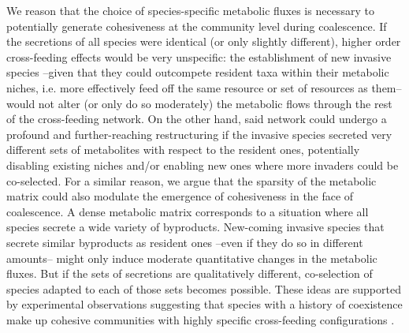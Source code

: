 \documentclass[a4paper,10pt]{article}
\begin{document}
\begin{mdframed}
We reason that the choice of species-specific metabolic fluxes is necessary to potentially generate
cohesiveness at the community level during coalescence.
If the secretions of all species were identical (or only slightly different),
higher order cross-feeding effects would be very unspecific:
the establishment of new invasive species
--given that they could outcompete resident taxa within their metabolic niches,
i.e. more effectively feed off the same resource or set of resources as them--
would not alter (or only do so moderately)
the metabolic flows through the rest of the cross-feeding network.
On the other hand, said network could undergo a profound and further-reaching restructuring
if the invasive species secreted very different sets of metabolites with respect to the resident ones,
potentially disabling existing niches and/or enabling new ones
where more invaders could be co-selected.
For a similar reason, we argue that the sparsity of the metabolic matrix could also modulate
the emergence of cohesiveness in the face of coalescence.
A dense metabolic matrix corresponds to a situation where all species secrete a wide
variety of byproducts.
New-coming invasive species that secrete similar byproducts as resident ones
--even if they do so in different amounts--
might only induce moderate quantitative changes in the metabolic fluxes.
But if the sets of secretions are qualitatively different, co-selection of species adapted to
each of those sets becomes possible.
These ideas are supported by experimental observations
suggesting that species with a history of coexistence make up
cohesive communities with highly specific cross-feeding configurations
\cite{Rosenzweig1994,Goldford2018,Estrela2020}.


\bigskip
\end{mdframed}

\clearpage
\end{document}
